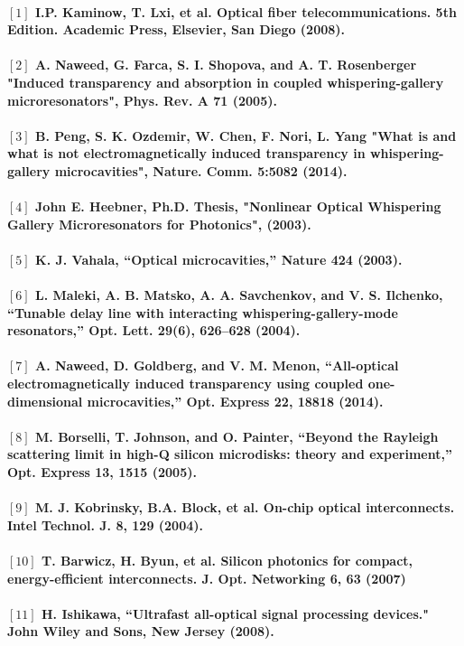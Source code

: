 \paragraph{\normalfont \large $[1]$  I.P. Kaminow, T. Lxi, et al. Optical fiber telecommunications. 5th Edition. Academic Press, Elsevier, San Diego (2008). \\ 
\\$[2]$ A. Naweed, G. Farca, S. I. Shopova, and A. T. Rosenberger "Induced transparency and absorption in coupled whispering-gallery microresonators", Phys. Rev. A \textbf{71} (2005). \\
\\$[3]$ B. Peng, S. K. Ozdemir, W. Chen, F. Nori, L. Yang "What is and what is not electromagnetically induced transparency in whispering-gallery microcavities", Nature. Comm. \textbf{5}:5082 (2014). \\
\\$[4]$ John E. Heebner, Ph.D. Thesis, "Nonlinear Optical Whispering Gallery Microresonators for Photonics", (2003). \\
\\$[5]$ K. J. Vahala, “Optical microcavities,” Nature \textbf{424} (2003).\\
\\$[6]$ L. Maleki, A. B. Matsko, A. A. Savchenkov, and V. S. Ilchenko, “Tunable delay line with interacting
whispering-gallery-mode resonators,” Opt. Lett. 29(6), 626–628 (2004).\\
\\$[7]$ A. Naweed, D. Goldberg, and V. M. Menon, “All-optical electromagnetically induced transparency using
coupled one-dimensional microcavities,” Opt. Express \textbf{22}, 18818 (2014).\\
\\$[8]$ M. Borselli, T. Johnson, and O. Painter, “Beyond the Rayleigh scattering limit in high-Q silicon microdisks:
theory and experiment,” Opt. Express \textbf{13}, 1515 (2005).\\
\\$[9]$ M. J. Kobrinsky, B.A. Block, et al. On-chip optical interconnects. Intel Technol. J. \textbf{8}, 129 (2004).\\
\\$[10]$ T. Barwicz, H. Byun, et al. Silicon photonics for compact, energy-efficient interconnects. J. Opt. Networking \textbf{6}, 63 (2007)\\
\\$[11]$ H. Ishikawa, “Ultrafast all-optical signal processing devices." John Wiley and Sons, New Jersey (2008). \\
}
